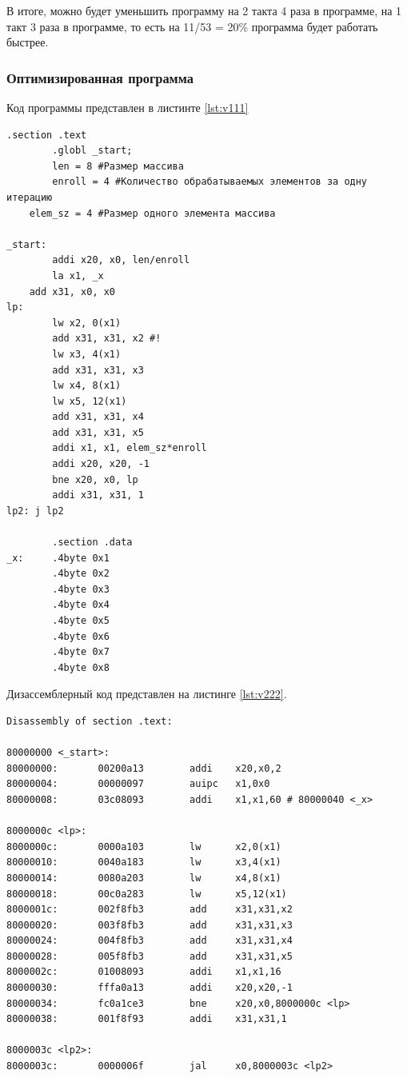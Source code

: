 В итоге, можно будет уменьшить программу на 2 такта 4 раза в программе, на 1 такт 3 раза в программе, то есть на 11/53 = 20\% программа будет работать быстрее.

\clearpage

\subsubsection*{Оптимизированная программа}

Код программы представлен в листинте \ref{lst:v111}

\begin{lstlisting}[label=lst:v111,caption=Код программы (оптимизированный)]
        .section .text
        .globl _start;
        len = 8 #Размер массива
        enroll = 4 #Количество обрабатываемых элементов за одну итерацию
	elem_sz = 4 #Размер одного элемента массива

_start:
        addi x20, x0, len/enroll
        la x1, _x
	add x31, x0, x0
lp:
        lw x2, 0(x1)
        add x31, x31, x2 #!
        lw x3, 4(x1)
        add x31, x31, x3
        lw x4, 8(x1)
        lw x5, 12(x1)
        add x31, x31, x4
        add x31, x31, x5
        addi x1, x1, elem_sz*enroll
        addi x20, x20, -1
        bne x20, x0, lp
        addi x31, x31, 1
lp2: j lp2

        .section .data
_x:     .4byte 0x1
        .4byte 0x2
        .4byte 0x3
        .4byte 0x4
        .4byte 0x5
        .4byte 0x6
        .4byte 0x7
        .4byte 0x8
\end{lstlisting}

\clearpage

Дизассемблерный код представлен на листинге \ref{lst:v222}.

\begin{lstlisting}[label=lst:v222,caption=Дизассемблированный код (оптимизированный)]
Disassembly of section .text:

80000000 <_start>:
80000000:       00200a13        addi    x20,x0,2
80000004:       00000097        auipc   x1,0x0
80000008:       03c08093        addi    x1,x1,60 # 80000040 <_x>

8000000c <lp>:
8000000c:       0000a103        lw      x2,0(x1)
80000010:       0040a183        lw      x3,4(x1)
80000014:       0080a203        lw      x4,8(x1)
80000018:       00c0a283        lw      x5,12(x1)
8000001c:       002f8fb3        add     x31,x31,x2
80000020:       003f8fb3        add     x31,x31,x3
80000024:       004f8fb3        add     x31,x31,x4
80000028:       005f8fb3        add     x31,x31,x5
8000002c:       01008093        addi    x1,x1,16
80000030:       fffa0a13        addi    x20,x20,-1
80000034:       fc0a1ce3        bne     x20,x0,8000000c <lp>
80000038:       001f8f93        addi    x31,x31,1

8000003c <lp2>:
8000003c:       0000006f        jal     x0,8000003c <lp2>
\end{lstlisting}
\clearpage

